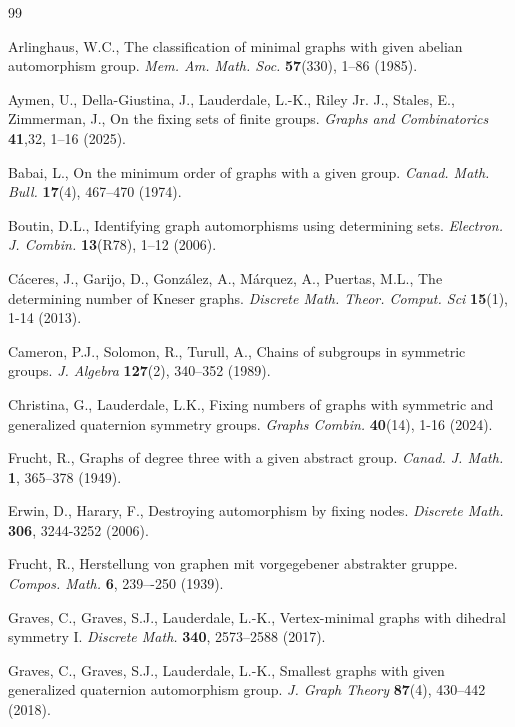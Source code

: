 \documentclass[12pt]{article}
\theoremstyle{plain}
\theoremstyle{definition}
\begin{document}
	
	\begin{thebibliography}{99}
		
		
		Arlinghaus, W.C., The classification of minimal graphs with given abelian automorphism group.
		\textit{Mem. Am. Math. Soc.} \textbf{57}(330), 1--86 (1985).
		
		Aymen, U., Della-Giustina, J., Lauderdale, L.-K., Riley Jr. J., Stales, E., Zimmerman, J., On the fixing sets of finite groups. \textit{Graphs and Combinatorics} \textbf{41},32, 1--16 (2025).
		
		Babai, L., On the minimum order of graphs with a given group.
		\textit{Canad. Math. Bull.} \textbf{17}(4), 467--470 (1974).	
		
		Boutin, D.L., Identifying graph automorphisms using determining sets.
		\textit{ Electron. J. Combin.} \textbf{13}(R78), 1–12 (2006).
		
		
		C\'{a}ceres, J., Garijo, D., Gonz\'{a}lez, A., M\'{a}rquez, A., Puertas, M.L., The determining number of Kneser graphs. 
		\textit{Discrete Math. Theor. Comput. Sci} \textbf{15}(1), 1-14 (2013). 
		
		Cameron, P.J., Solomon, R., Turull, A., Chains of subgroups in symmetric groups. \textit{J. Algebra} \textbf{127}(2), 340--352 (1989).
		
		Christina, G., Lauderdale, L.K., Fixing numbers of graphs with symmetric and generalized quaternion symmetry groups.
		\textit{Graphs Combin.} \textbf{40}(14), 1-16 (2024).
		
		Frucht, R., Graphs of degree three with a given abstract group. \textit{Canad. J. Math.} \textbf{1}, 365–378 (1949).		
		
		Erwin, D., Harary, F., Destroying automorphism by fixing nodes. \textit{Discrete Math.} \textbf{306}, 3244-3252 (2006).
		
		Frucht, R., Herstellung von graphen mit vorgegebener abstrakter gruppe.
		\textit{Compos. Math.} \textbf{6}, 239–-250 (1939).
		
		
		
		Graves, C., Graves, S.J., Lauderdale, L.-K., Vertex-minimal graphs with dihedral symmetry I. 
		\textit{Discrete Math.} \textbf{340}, 2573–2588 (2017).
		
		Graves, C., Graves, S.J., Lauderdale, L.-K., Smallest graphs with given generalized quaternion automorphism group.
		\textit{J. Graph Theory} \textbf{87}(4), 430–442 (2018).
		

\end{thebibliography}
\end{document}
